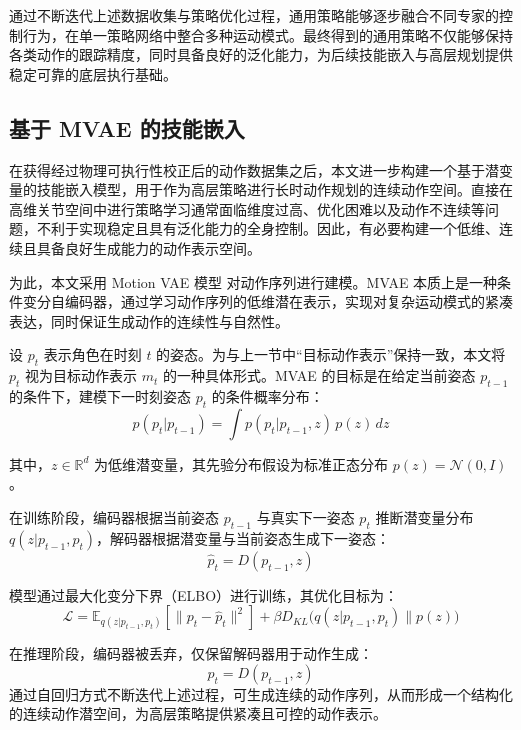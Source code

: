 通过不断迭代上述数据收集与策略优化过程，通用策略能够逐步融合不同专家的控制行为，在单一策略网络中整合多种运动模式。最终得到的通用策略不仅能够保持各类动作的跟踪精度，同时具备良好的泛化能力，为后续技能嵌入与高层规划提供稳定可靠的底层执行基础。


\subsection{基于 MVAE 的技能嵌入}

在获得经过物理可执行性校正后的动作数据集之后，本文进一步构建一个基于潜变量的技能嵌入模型，用于作为高层策略进行长时动作规划的连续动作空间。直接在高维关节空间中进行策略学习通常面临维度过高、优化困难以及动作不连续等问题，不利于实现稳定且具有泛化能力的全身控制。因此，有必要构建一个低维、连续且具备良好生成能力的动作表示空间。

为此，本文采用 Motion VAE 模型 \cite{ling2020character} 对动作序列进行建模。MVAE 本质上是一种条件变分自编码器，通过学习动作序列的低维潜在表示，实现对复杂运动模式的紧凑表达，同时保证生成动作的连续性与自然性。

设 $p_t$ 表示角色在时刻 $t$ 的姿态。为与上一节中“目标动作表示”保持一致，本文将 $p_t$ 视为目标动作表示 $m_t$ 的一种具体形式。MVAE 的目标是在给定当前姿态 $p_{t-1}$ 的条件下，建模下一时刻姿态 $p_t$ 的条件概率分布：
\begin{equation}
	p(p_t | p_{t-1}) =
	\int p(p_t | p_{t-1}, z)\, p(z)\, dz 
\end{equation}

其中，$z \in \mathbb{R}^d$ 为低维潜变量，其先验分布假设为标准正态分布 $p(z)=\mathcal{N}(0,I)$。

在训练阶段，编码器根据当前姿态 $p_{t-1}$ 与真实下一姿态 $p_t$ 推断潜变量分布 $q(z|p_{t-1},p_t)$，解码器根据潜变量与当前姿态生成下一姿态：
\begin{equation}
	\hat{p}_t = D(p_{t-1}, z)
\end{equation}

模型通过最大化变分下界（ELBO）进行训练，其优化目标为：
\begin{equation}
	\mathcal{L} =
	\mathbb{E}_{q(z|p_{t-1},p_t)}
	[\|p_t-\hat{p}_t\|^2]
	+
	\beta D_{KL}
	\big(q(z|p_{t-1},p_t)\|p(z)\big)
\end{equation}

在推理阶段，编码器被丢弃，仅保留解码器用于动作生成：
\begin{equation}
	p_t = D(p_{t-1}, z)
\end{equation}
通过自回归方式不断迭代上述过程，可生成连续的动作序列，从而形成一个结构化的连续动作潜空间，为高层策略提供紧凑且可控的动作表示。

